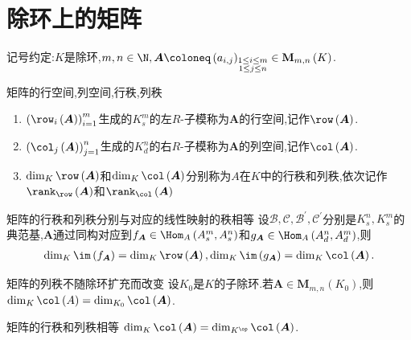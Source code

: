 \section{除环上的矩阵}

记号约定:$K$是除环,$m,n\in\N,\boldsymbol{A}\coloneq\left(a_{i,j}\right)_{\substack{1\leq i\leq m\\1\leq j\leq n}}\in\mathbf{M}_{m,n}\left(K\right)$.

\begin{definition}{矩阵的行空间,列空间,行秩,列秩}{}
	\begin{enumerate}
		\item $\left(\row_{i}\left(\boldsymbol{A}\right)\right)_{i=1}^{m}$生成的$K_{s}^{m}$的左$R$-子模称为$\boldsymbol{A}$的行空间,记作$\row\left(\boldsymbol{A}\right)$.
		\item $\left(\col_{j}\left(\boldsymbol{A}\right)\right)_{j=1}^{n}$生成的$K_{d}^{n}$的右$R$-子模称为$\boldsymbol{A}$的列空间,记作$\col\left(\boldsymbol{A}\right)$.
		\item $\dim_{K}\row\left(\boldsymbol{A}\right)$和$\dim_{K}\col\left(\boldsymbol{A}\right)$分别称为$A$在$K$中的行秩和列秩,依次记作$\rank_{\row}\left(\boldsymbol{A}\right)$和$\rank_{\col}\left(\boldsymbol{A}\right)$
	\end{enumerate}
\end{definition}

\begin{proposition}{矩阵的行秩和列秩分别与对应的线性映射的秩相等}{}
	设$\mathcal{B},\mathcal{C},\mathcal{B}^{\prime},\mathcal{C}^{\prime}$分别是$K_{s}^{n},K_{s}^{m}$的典范基,$\boldsymbol{A}$通过同构对应到$f_{\boldsymbol{A}}\in\Hom_{A}\left(A_{s}^{m},A_{s}^{n}\right)$和$g_{\boldsymbol{A}}\in\Hom_{A}\left(A_{d}^{n},A_{d}^{m}\right)$,则
	\begin{align*}
		\dim_{K}\im\left(f_{\boldsymbol{A}}\right)=\dim_{K}\row\left(\boldsymbol{A}\right),\dim_{K}\im\left(g_{\boldsymbol{A}}\right)=\dim_{K}\col\left(\boldsymbol{A}\right).
	\end{align*}
\end{proposition}

\begin{proposition}{矩阵的列秩不随除环扩充而改变}{}
	设$K_{0}$是$K$的子除环.若$\boldsymbol{A}\in\mathbf{M}_{m,n}\left(K_{0}\right)$,则$\dim_{K}\col\left(A\right)=\dim_{K_{0}}\col\left(\boldsymbol{A}\right)$.
\end{proposition}

\begin{proposition}{矩阵的行秩和列秩相等}{}
	$\dim_{K}\col\left(\boldsymbol{A}\right)=\dim_{K^{\op}}\col\left(\boldsymbol{A}\right)$.
\end{proposition}

